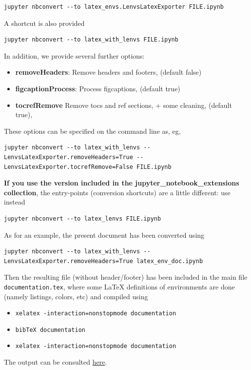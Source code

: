 \begin{verbatim}
jupyter nbconvert --to latex_envs.LenvsLatexExporter FILE.ipynb
\end{verbatim}

A shortcut is also provided

\begin{verbatim}
jupyter nbconvert --to latex_with_lenvs FILE.ipynb
\end{verbatim}

In addition, we provide several further options:

\begin{itemize}
\tightlist
\item
  \textbf{removeHeaders}: Remove headers and footers, (default false)
\item
  \textbf{figcaptionProcess}: Process figcaptions, (default true)
\item
  \textbf{tocrefRemove} Remove tocs and ref sections, + some cleaning,
  (default true),
\end{itemize}

These options can be specified on the command line as, eg,

\begin{verbatim}
jupyter nbconvert --to latex_with_lenvs --LenvsLatexExporter.removeHeaders=True -- LenvsLatexExporter.tocrefRemove=False FILE.ipynb
\end{verbatim}

\textbf{If you use the version included in the
jupyter\_notebook\_extensions collection}, the entry-points (conversion
shortcuts) are a little different: use instead

\begin{verbatim}
jupyter nbconvert --to latex_lenvs FILE.ipynb
\end{verbatim}

    \begin{example} As for an example, the present document has
been converted using

\begin{verbatim}
jupyter nbconvert --to latex_with_lenvs --LenvsLatexExporter.removeHeaders=True latex_env_doc.ipynb
\end{verbatim}

Then the resulting file (without header/footer) has been included in the
main file \texttt{documentation.tex}, where some LaTeX definitions of
environments are done (namely listings, colors, etc) and compiled using

\begin{itemize}
\tightlist
\item
  \texttt{xelatex\ -interaction=nonstopmode\ documentation}
\item
  \texttt{bibTeX\ documentation}
\item
  \texttt{xelatex\ -interaction=nonstopmode\ documentation}
\end{itemize}

The output can be consulted \href{documentation.pdf}{here}.\\
\end{example}

